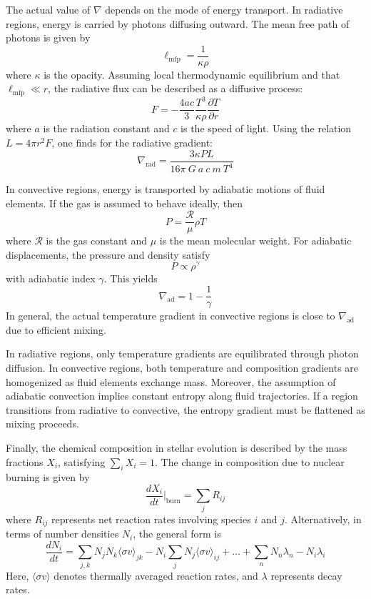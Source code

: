 The actual value of $\nabla$ depends on the mode of energy transport.  
In radiative regions, energy is carried by photons diffusing outward.  
The mean free path of photons is given by  
\[
\ell_{\mathrm{mfp}} = \frac{1}{\kappa \rho}
\]
where $\kappa$ is the opacity.  
Assuming local thermodynamic equilibrium and that $\ell_{\mathrm{mfp}} \ll r$, the radiative flux can be described as a diffusive process:  
\[
F = -\frac{4ac}{3}\frac{T^3}{\kappa \rho}\frac{\partial T}{\partial r}
\]
where $a$ is the radiation constant and $c$ is the speed of light.  
Using the relation $L = 4\pi r^2 F$, one finds for the radiative gradient:  
\begin{equation}\label{eq:nabla_rad}
\nabla_{\mathrm{rad}} = \frac{3\kappa P L}{16\pi~G~a~c~m~T^4}
\end{equation}

In convective regions, energy is transported by adiabatic motions of fluid elements.  
If the gas is assumed to behave ideally, then  
\[
P = \frac{\mathscr{R}}{\mu}\rho T
\]
where $\mathscr{R}$ is the gas constant and $\mu$ is the mean molecular weight.  
For adiabatic displacements, the pressure and density satisfy  
\[
P \propto \rho^\gamma
\]
with adiabatic index $\gamma$.  
This yields  
\begin{equation}\label{eq:nabla_ad}
\nabla_{\mathrm{ad}} = 1 - \frac{1}{\gamma}
\end{equation}
In general, the actual temperature gradient in convective regions is close to $\nabla_{\mathrm{ad}}$ due to efficient mixing.  

In radiative regions, only temperature gradients are equilibrated through photon diffusion.  
In convective regions, both temperature and composition gradients are homogenized as fluid elements exchange mass.  
Moreover, the assumption of adiabatic convection implies constant entropy along fluid trajectories.  
If a region transitions from radiative to convective, the entropy gradient must be flattened as mixing proceeds.

Finally, the chemical composition in stellar evolution is described by the mass fractions $X_i$, satisfying $\sum_i X_i = 1$.  
The change in composition due to nuclear burning is given by  
\begin{equation}\label{eq:dX_dt_burn}
\frac{d X_i}{dt}\Big|_{\mathrm{burn}} = \sum_j R_{ij}
\end{equation}
where $R_{ij}$ represents net reaction rates involving species $i$ and $j$.  
Alternatively, in terms of number densities $N_i$, the general form is  
\[
\frac{dN_i}{dt} = \sum_{j,k} N_j N_k \langle\sigma v\rangle_{jk} - N_i \sum_j N_j \langle\sigma v\rangle_{ij} + \ldots + \sum_n N_n \lambda_n - N_i \lambda_i
\]
Here, $\langle\sigma v\rangle$ denotes thermally averaged reaction rates, and $\lambda$ represents decay rates.

